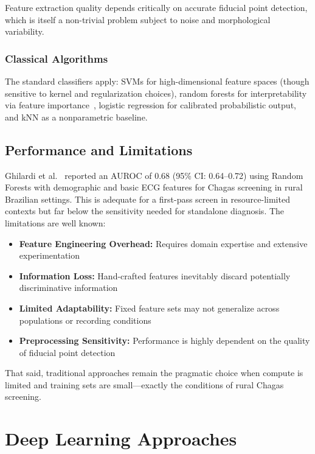 Feature extraction quality depends critically on accurate fiducial point detection, which is itself a non-trivial problem subject to noise and morphological variability.

\subsubsection{Classical Algorithms}

The standard classifiers apply: SVMs for high-dimensional feature spaces (though sensitive to kernel and regularization choices), random forests for interpretability via feature importance~\cite{ghilardi2024machine}, logistic regression for calibrated probabilistic output, and kNN as a nonparametric baseline.

\subsection{Performance and Limitations}

Ghilardi et al.~\cite{ghilardi2024machine} reported an AUROC of 0.68 (95\% CI: 0.64--0.72) using Random Forests with demographic and basic ECG features for Chagas screening in rural Brazilian settings. This is adequate for a first-pass screen in resource-limited contexts but far below the sensitivity needed for standalone diagnosis. The limitations are well known:

\begin{itemize}
    \item \textbf{Feature Engineering Overhead:} Requires domain expertise and extensive experimentation
    \item \textbf{Information Loss:} Hand-crafted features inevitably discard potentially discriminative information
    \item \textbf{Limited Adaptability:} Fixed feature sets may not generalize across populations or recording conditions
    \item \textbf{Preprocessing Sensitivity:} Performance is highly dependent on the quality of fiducial point detection
\end{itemize}

That said, traditional approaches remain the pragmatic choice when compute is limited and training sets are small---exactly the conditions of rural Chagas screening.

\section{Deep Learning Approaches}

